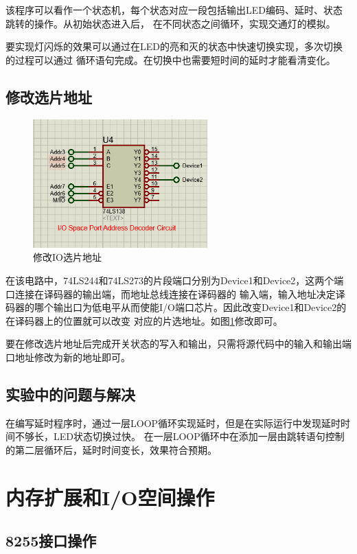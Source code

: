 \documentclass[12pt, a4paper, oneside]{ctexart}
\begin{document}
    该程序可以看作一个状态机，每个状态对应一段包括输出LED编码、延时、状态跳转的操作。从初始状态进入后，
    在不同状态之间循环，实现交通灯的模拟。

    要实现灯闪烁的效果可以通过在LED的亮和灭的状态中快速切换实现，多次切换的过程可以通过
    循环语句完成。在切换中也需要短时间的延时才能看清变化。
    \subsection{修改选片地址}
    \begin{figure}[!h]
        \centering
        \includegraphics[width=0.6\textwidth]{img/change.png}
        \caption{修改IO选片地址}
        \label{fig:change}
    \end{figure}
    在该电路中，74LS244和74LS273的片段端口分别为Device1和Device2，这两个端口连接在译码器的输出端，而地址总线连接在译码器的
    输入端，输入地址决定译码器的哪个输出口为低电平从而使能I/O端口芯片。因此改变Device1和Device2的在译码器上的位置就可以改变
    对应的片选地址。如图\ref{fig:change}修改即可。

    要在修改选片地址后完成开关状态的写入和输出，只需将源代码中的输入和输出端口地址修改为新的地址即可。

    \subsection{实验中的问题与解决}
    在编写延时程序时，通过一层LOOP循环实现延时，但是在实际运行中发现延时时间不够长，LED状态切换过快。
    在一层LOOP循环中在添加一层由跳转语句控制的第二层循环后，延时时间变长，效果符合预期。
    \section{内存扩展和I/O空间操作}
    \subsection{8255接口操作}
\end{document}
